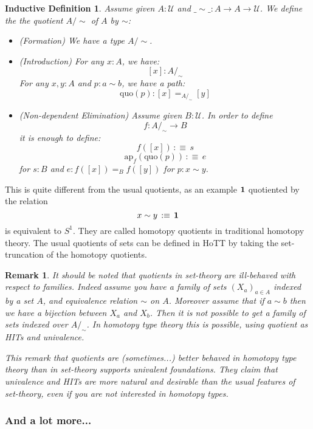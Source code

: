 \documentclass{article}
\newcommand{\ssse}[1]{\subsubsection*{#1}}
\newcommand{\U}{{\mathcal U}}
\renewcommand{\r}{\rightarrow}
\newcommand{\ap}{\mathrm{ap}}
\newcommand{\one}{{\bf 1}}
\newtheorem{remark}{Remark}
\newtheorem{ind_def}{Inductive Definition}
\begin{document}
\begin{ind_def}
Assume given $A:\U$ and $\_\sim\_:A\r A\r \U$. We define the the quotient $A/\sim$ of $A$ by $\sim$:
\begin{itemize}
\item (Formation) We have a type $A/\sim$.
\item (Introduction) For any $x:A$, we have:
\[[x] : A/_\sim\] 
For any $x,y:A$ and $p:a\sim b$, we have a path:
\[\mathrm{quo}(p) : [x] =_{A/_\sim} [y]\]
\item (Non-dependent Elimination) Assume given $B : \U$. In order to define 
\[f:A/_\sim\r B\]
 it is enough to define:
\[f([x]) \, :\equiv \, s \]
\[\ap_f(\mathrm{quo}(p)) \, :\equiv\, e\]
for $s:B$ and $e:f([x])=_{B}f([y])$ for $p:x\sim y$.
\end{itemize}
\end{ind_def}

This is quite different from the usual quotients, as an example $\one$ quotiented by the relation 
\[x\sim y \, :\equiv\, \one\]
is equivalent to $S^1$. They are called homotopy quotients in traditional homotopy theory. The usual quotients of sets can be defined in HoTT by taking the set-truncation of the homotopy quotients. 

\begin{remark}
It should be noted that quotients in set-theory are ill-behaved with respect to families. Indeed assume you have a family of sets $(X_a)_{a\in A}$ indexed by a set $A$, and equivalence relation $\sim$ on $A$. Moreover assume that if $a\sim b$ then we have a bijection between $X_a$ and $X_b$. Then it is not possible to get a family of sets indexed over $A/_\sim$. In homotopy type theory this is possible, using quotient as HITs and univalence.

This remark that quotients are (sometimes...) better behaved in homotopy type theory than in set-theory supports \emph{univalent foundations}. They claim that univalence and HITs are more natural and desirable than the usual features of set-theory, even if you are not interested in homotopy types. %
 \end{remark}


\ssse{And a lot more...}
\end{document}
